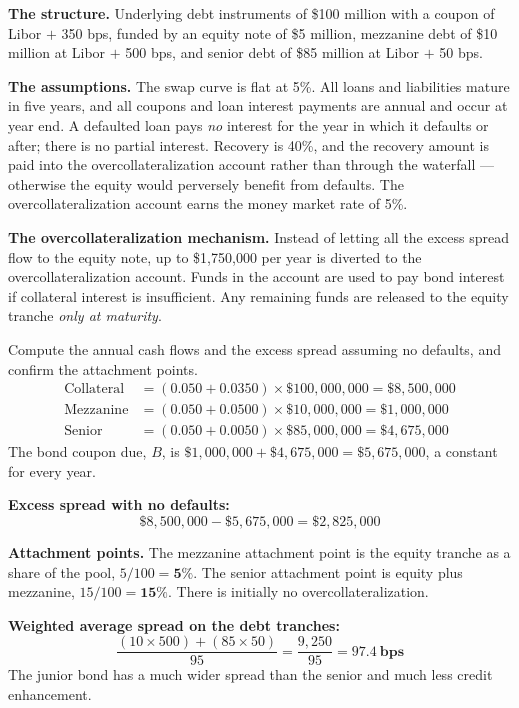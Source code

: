 \begin{crgapbox}
\textbf{The structure.} Underlying debt instruments of \$100 million with a coupon
of Libor $+$ 350 bps, funded by an equity note of \$5 million, mezzanine debt of
\$10 million at Libor $+$ 500 bps, and senior debt of \$85 million at Libor $+$
50 bps.

\smallskip
\textbf{The assumptions.} The swap curve is flat at 5\%. All loans and liabilities
mature in five years, and all coupons and loan interest payments are annual and
occur at year end. A defaulted loan pays \emph{no} interest for the year in which
it defaults or after; there is no partial interest. Recovery is 40\%, and the
recovery amount is paid into the overcollateralization account rather than through
the waterfall --- otherwise the equity would perversely benefit from defaults. The
overcollateralization account earns the money market rate of 5\%.

\smallskip
\textbf{The overcollateralization mechanism.} Instead of letting all the excess
spread flow to the equity note, up to \$1,750,000 per year is diverted to the
overcollateralization account. Funds in the account are used to pay bond interest
if collateral interest is insufficient. Any remaining funds are released to the
equity tranche \emph{only at maturity}.
\end{crgapbox}

\begin{crexbox}
Compute the annual cash flows and the excess spread assuming no defaults, and
confirm the attachment points.
\tcblower
\begin{align*}
\text{Collateral} &= (0.050 + 0.0350)\times \$100{,}000{,}000 = \$8{,}500{,}000 \\
\text{Mezzanine} &= (0.050 + 0.0500)\times \$10{,}000{,}000 = \$1{,}000{,}000 \\
\text{Senior} &= (0.050 + 0.0050)\times \$85{,}000{,}000 = \$4{,}675{,}000
\end{align*}
The bond coupon due, $B$, is $\$1{,}000{,}000 + \$4{,}675{,}000 =
\$5{,}675{,}000$, a constant for every year.

\smallskip
\textbf{Excess spread with no defaults:}
\[ \$8{,}500{,}000 - \$5{,}675{,}000 = \$2{,}825{,}000 \]

\textbf{Attachment points.} The mezzanine attachment point is the equity tranche
as a share of the pool, $5/100 = \mathbf{5\%}$. The senior attachment point is
equity plus mezzanine, $15/100 = \mathbf{15\%}$. There is initially no
overcollateralization.

\smallskip
\textbf{Weighted average spread on the debt tranches:}
\[ \frac{(10 \times 500) + (85 \times 50)}{95} = \frac{9{,}250}{95}
   = \mathbf{97.4\ \text{bps}} \]
The junior bond has a much wider spread than the senior and much less credit
enhancement.
\end{crexbox}

